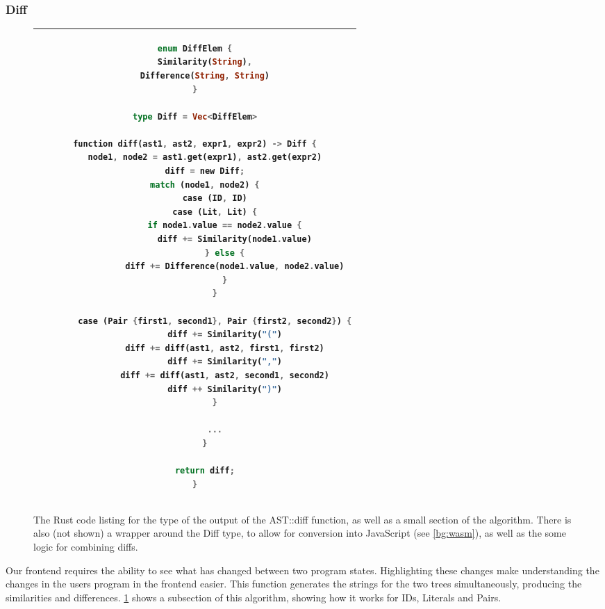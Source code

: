 \subsubsection{Diff}
\begin{figure}[t]
    \centering
    \begin{tabular}{|c|}
        \hline
    \begin{lstlisting}[language=Rust]
enum DiffElem {
    Similarity(String),
    Difference(String, String)
}

type Diff = Vec<DiffElem>

function diff(ast1, ast2, expr1, expr2) -> Diff {
    node1, node2 = ast1.get(expr1), ast2.get(expr2)
    diff = new Diff;
    match (node1, node2) {
        case (ID, ID)
        case (Lit, Lit) {
            if node1.value == node2.value {
                diff += Similarity(node1.value)
            } else {
                diff += Difference(node1.value, node2.value)
            }
        }

        case (Pair {first1, second1}, Pair {first2, second2}) {
            diff += Similarity("(")
            diff += diff(ast1, ast2, first1, first2)
            diff += Similarity(",")
            diff += diff(ast1, ast2, second1, second2)
            diff ++ Similarity(")")
        }

        ...
    }
    
    return diff;
}
    \end{lstlisting}
    \\\hline
    \end{tabular}
    \caption{The Rust code listing for the type of the output of the AST::diff function, as well as a small section of the algorithm. There is also (not shown) a wrapper around the Diff type, to allow for conversion into JavaScript (see \ref{bg:wasm}), as well as the some logic for combining diffs.}
    \label{fig:diff_list}
\end{figure}

\label{paragraph:diff} Our frontend requires the ability to see what has changed between two program states. Highlighting these changes make understanding the changes in the users program in the frontend easier. This function generates the strings for the two trees simultaneously, producing the similarities and differences. \ref{fig:diff_list} shows a subsection of this algorithm, showing how it works for IDs, Literals and Pairs.

